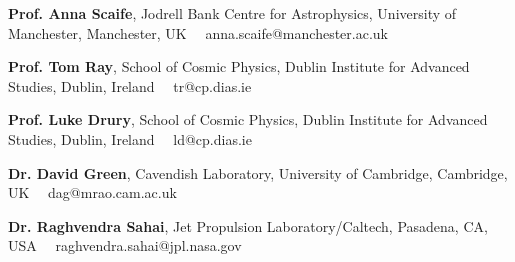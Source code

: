 \begin{cvpubs}
  \cvpub
    {
      \begin{cvlist}
        \item {\textbf{Prof. Anna Scaife}, Jodrell Bank Centre for Astrophysics, University of Manchester, Manchester, UK \hspace{1ex} \faEnvelope\ \ anna.scaife@manchester.ac.uk}
        \item {\textbf{Prof. Tom Ray}, School of Cosmic Physics, Dublin Institute for Advanced Studies, Dublin, Ireland \hspace{1ex} \faEnvelope\ \ tr@cp.dias.ie}
        \item {\textbf{Prof. Luke Drury}, School of Cosmic Physics, Dublin Institute for Advanced Studies, Dublin, Ireland \hspace{1ex} \faEnvelope\ \ ld@cp.dias.ie}
        \item {\textbf{Dr. David Green}, Cavendish Laboratory, University of Cambridge, Cambridge, UK \hspace{1ex} \faEnvelope\ \ dag@mrao.cam.ac.uk}
        \item {\textbf{Dr. Raghvendra Sahai}, Jet Propulsion Laboratory/Caltech, Pasadena, CA, USA \hspace{1ex} \faEnvelope\ \ raghvendra.sahai@jpl.nasa.gov}
      \end{cvlist}
    }
\end{cvpubs}